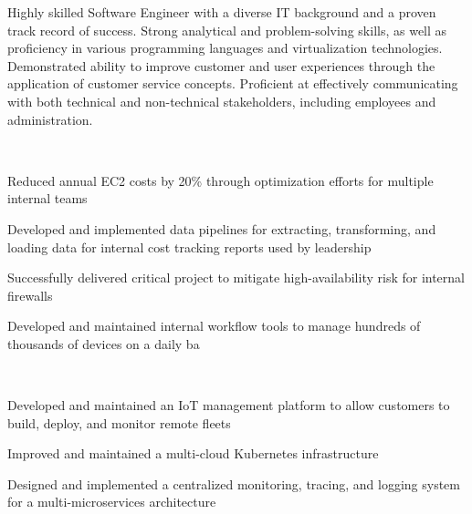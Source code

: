 \documentclass[a4paper]{MagicalCV}
\begin{document}
\begin{minipage}[t]{0.66\textwidth} 


Highly skilled Software Engineer with a diverse IT background and a proven track record of success. Strong analytical and problem-solving skills, as well as proficiency in various programming languages and virtualization technologies. Demonstrated ability to improve customer and user experiences through the application of customer service concepts. Proficient at effectively communicating with both technical and non-technical stakeholders, including employees and administration.


 \\
\vspace{\topsep} %
\begin{tightemize}
\item Reduced annual EC2 costs by 20\% through optimization efforts for multiple internal teams
\item Developed and implemented data pipelines for extracting, transforming, and loading data for internal cost tracking reports used by leadership
\item Successfully delivered critical project to mitigate high-availability risk for internal firewalls
\item Developed and maintained internal workflow tools to manage hundreds of thousands of devices on a daily ba
\end{tightemize}
\sectionsep

 \\
\vspace{\topsep} %
\begin{tightemize}
\item Developed and maintained an IoT management platform to allow customers to build, deploy, and monitor remote fleets
\item Improved and maintained a multi-cloud Kubernetes infrastructure
\item Designed and implemented a centralized monitoring, tracing, and logging system for a multi-microservices architecture
\end{tightemize}
\sectionsep


\end{minipage}
\end{document}
